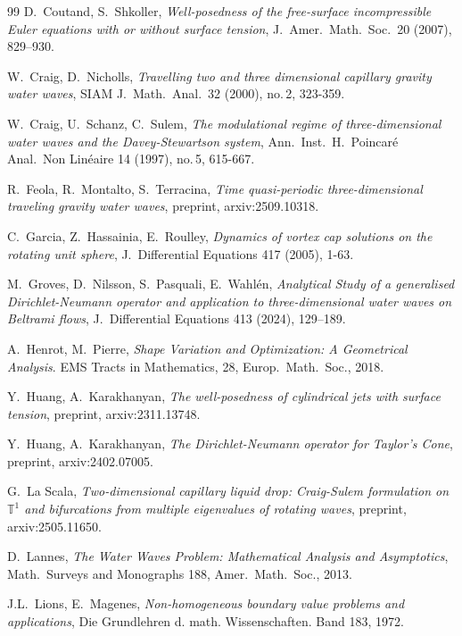 \documentclass[10pt,reqno,a4paper]{article}
\numberwithin{equation}{section}
\theoremstyle{plain}
\theoremstyle{definition}
\newcommand{\T}{{\mathbb T}}
\begin{document}
\begin{thebibliography}{99}
D.\ Coutand, S.\ Shkoller, 
\emph{Well-posedness of the free-surface incompressible Euler equations with or without surface tension}, 
J.\ Amer.\ Math.\ Soc.\ 20 (2007), 829–930.

W.\ Craig, D.\ Nicholls, 
\emph{Travelling two and three dimensional capillary gravity water waves}, 
SIAM J.\ Math.\ Anal.\ 32 (2000), no.\,2, 323-359.

W.\ Craig, U.\ Schanz, C.\ Sulem, 
\emph{The modulational regime of three-dimensional water waves and the Davey-Stewartson system}, 
Ann.\ Inst.\ H.\ Poincar\'e Anal.\ Non Lin\'eaire 14 (1997), no.\,5, 615-667.

R.\ Feola, R.\ Montalto, S.\ Terracina, 
\emph{Time quasi-periodic three-dimensional traveling gravity water waves},
preprint, arxiv:2509.10318.

C.\ Garcia, Z.\ Hassainia, E.\ Roulley,
\emph{Dynamics of vortex cap solutions on the rotating unit sphere},
J.\ Differential Equations 417 (2005), 1-63.

M.\ Groves, D.\ Nilsson, S.\ Pasquali, E.\ Wahl\'en, 
\emph{Analytical Study of a generalised Dirichlet-Neumann operator 
and application to three-dimensional water waves on Beltrami flows}, 
J.\ Differential Equations 413 (2024), 129–189.

A.\ Henrot, M.\ Pierre, 
\emph{Shape Variation and Optimization: A Geometrical Analysis}.
EMS Tracts in Mathematics, 28, Europ.\ Math.\ Soc., 2018.

Y.\ Huang, A.\ Karakhanyan, 
\emph{The well-posedness of cylindrical jets with surface tension}, 
preprint, arxiv:2311.13748.

Y.\ Huang, A.\ Karakhanyan, 
\emph{The Dirichlet-Neumann operator for Taylor’s Cone}, 
preprint, arxiv:2402.07005.

G.\ La Scala, 
\emph{Two-dimensional capillary liquid drop: Craig-Sulem formulation on $\T^1$ 
and bifurcations from multiple eigenvalues of rotating waves}, 
preprint, arxiv:2505.11650.

D.\ Lannes, 
\emph{The Water Waves Problem: Mathematical Analysis and Asymptotics}, 
Math.\ Surveys and Monographs 188, Amer.\ Math.\ Soc., 2013.

J.L.\ Lions, E.\ Magenes,
\emph{Non-homogeneous boundary value problems and applications}, 
Die Grundlehren d. math. Wissenschaften. Band 183, 1972.


\end{thebibliography}
\end{document}
